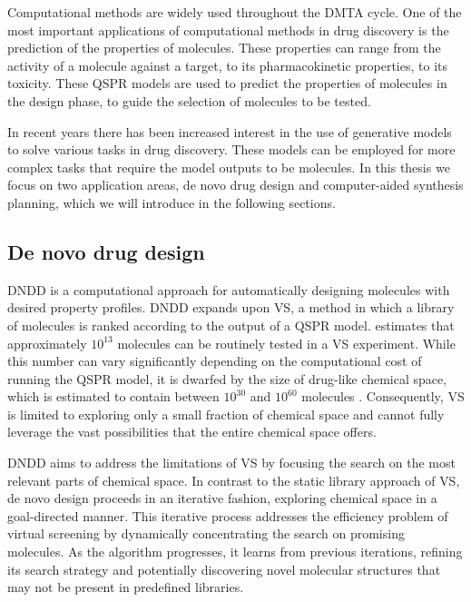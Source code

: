 Computational methods are widely used throughout the DMTA cycle.
One of the most important applications of computational methods in drug discovery is the prediction of
the properties of molecules. These properties can range from the activity of a molecule against a
target, to its pharmacokinetic properties, to its toxicity. These \ac{QSPR} models are used to
predict the properties of molecules in the design phase, to guide the selection of molecules to be
tested.

In recent years there has been increased interest in the use of generative models to solve various
tasks in drug discovery. These models can be employed for more complex tasks that require the
model outputs to be molecules. In this thesis we focus on two application areas, de novo drug design
and computer-aided synthesis planning, which we will introduce in the following sections.

\subsection{De novo drug design}
\Ac{DNDD} \citep{schneiderNovoMolecularDesign2013} is a computational approach for automatically designing molecules with desired property
profiles. \Ac{DNDD} expands upon \ac{VS}, a method in which a library of molecules is ranked
according to the output of a \ac{QSPR} model. \citet{waltersVirtualChemicalLibraries2019} estimates
that approximately $10^{13}$ molecules can be routinely tested in a \ac{VS} experiment. While this
number can vary significantly depending on the computational cost of running the \ac{QSPR} model, it
is dwarfed by the size of drug-like chemical space, which is estimated to contain between $10^{30}$
and $10^{60}$ molecules
\citep{waltersVirtualChemicalLibraries2019,ruddigkeitEnumeration166Billion2012}. Consequently,
\ac{VS} is limited to exploring only a small fraction of chemical space and cannot fully leverage
the vast possibilities that the entire chemical space offers.

\Ac{DNDD} aims to address the limitations of \ac{VS} by focusing the search on the most relevant
parts of chemical space. In contrast to the static library approach of \ac{VS}, de novo design
proceeds in an iterative fashion, exploring chemical space in a goal-directed manner. This iterative
process addresses the efficiency problem of virtual screening by dynamically concentrating the
search on promising molecules. As the algorithm progresses, it learns from previous iterations,
refining its search strategy and potentially discovering novel molecular structures that may not be
present in predefined libraries.


